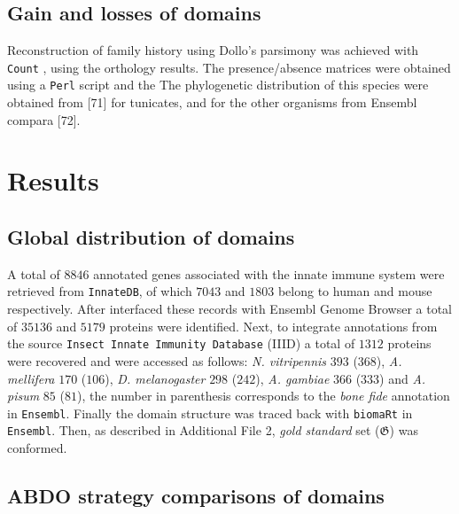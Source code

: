 \documentclass[11pt]{article}
\newcommand{\TODO}[1]{\begingroup\color{red}#1\endgroup}
\begin{document}
\subsection*{Gain and losses of domains}

Reconstruction of family history using Dollo's parsimony was achieved with \texttt{Count} \cite{csuros2010}, using the orthology results. The presence/absence matrices were obtained using
a \texttt{Perl} script and the The phylogenetic distribution of this species 
were obtained from \TODO{[71]} for tunicates, and for the other organisms from 
Ensembl compara \TODO{[72]}.

\section*{Results}

\subsection*{Global distribution of domains}

A total of $8846$ annotated genes associated with the innate immune system were retrieved 
from \texttt{InnateDB}, of which $7043$ and $1803$ belong to human and mouse 
respectively. After interfaced these records with Ensembl Genome Browser a total 
of $35136$ and $5179$ proteins were identified. Next, to integrate annotations from
the source \texttt{Insect Innate Immunity Database} (IIID) a total of $1312$ proteins were
recovered and were accessed as follows: \textsl{N. vitripennis} $393$ ($368$), 
\textsl{A. mellifera} $170$ ($106$), \textsl{D. melanogaster} $298$ ($242$), \textsl{A. gambiae}
$366$ ($333$) and \textsl{A. pisum} $85$ ($81$), the number in parenthesis corresponds to 
the \textsl{bone fide} annotation in \texttt{Ensembl}. Finally the domain structure was 
traced back with \texttt{biomaRt} in \texttt{Ensembl}. Then, as described in Additional 
File 2, \textsl{gold standard} set ($\boldsymbol{\mathfrak{G}}$) was conformed.

\subsection*{\textbf{ABDO} strategy comparisons of domains}\label{subODB}
\end{document}
